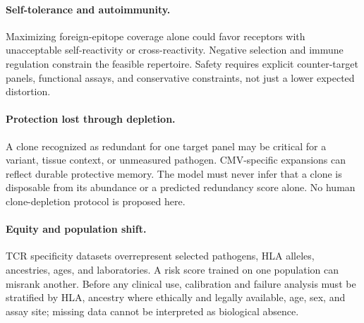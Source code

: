 \documentclass[11pt]{article}
\begin{document}
\paragraph{Self-tolerance and autoimmunity.} Maximizing foreign-epitope coverage alone could favor receptors with unacceptable self-reactivity or cross-reactivity. Negative selection and immune regulation constrain the feasible repertoire. Safety requires explicit counter-target panels, functional assays, and conservative constraints, not just a lower expected distortion.

\paragraph{Protection lost through depletion.} A clone recognized as redundant for one target panel may be critical for a variant, tissue context, or unmeasured pathogen. CMV-specific expansions can reflect durable protective memory. The model must never infer that a clone is disposable from its abundance or a predicted redundancy score alone. No human clone-depletion protocol is proposed here.

\paragraph{Equity and population shift.} TCR specificity datasets overrepresent selected pathogens, HLA alleles, ancestries, ages, and laboratories. A risk score trained on one population can misrank another. Before any clinical use, calibration and failure analysis must be stratified by HLA, ancestry where ethically and legally available, age, sex, and assay site; missing data cannot be interpreted as biological absence.
\end{document}
